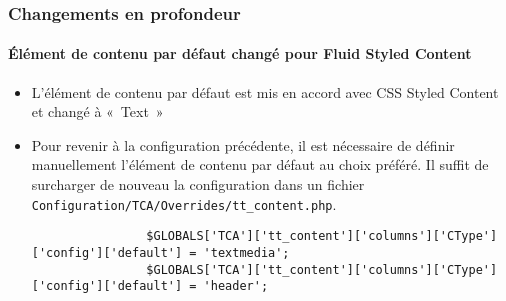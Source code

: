 
\begin{frame}[fragile]
	\frametitle{Changements en profondeur}
	\framesubtitle{Élément de contenu par défaut changé pour Fluid Styled Content}

	\lstset{basicstyle=\tiny\ttfamily}

	\begin{itemize}
		\item L'élément de contenu par défaut est mis en accord avec CSS Styled Content
			et changé à «~Text~»
		\item Pour revenir à la configuration précédente, il est nécessaire de définir
			manuellement l'élément de contenu par défaut au choix préféré. Il suffit de
			surcharger de nouveau la configuration dans un fichier
			\texttt{Configuration/TCA/Overrides/tt\_content.php}.

			\begin{lstlisting}
				$GLOBALS['TCA']['tt_content']['columns']['CType']['config']['default'] = 'textmedia';
				$GLOBALS['TCA']['tt_content']['columns']['CType']['config']['default'] = 'header';
			\end{lstlisting}

	\end{itemize}

\end{frame}


